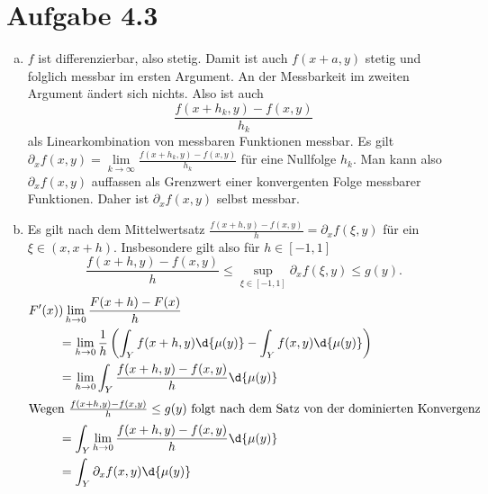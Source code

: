 \documentclass{article}
\begin{document}
    \section*{Aufgabe 4.3}
    \begin{enumerate}[(a)]
        \item $f$ ist differenzierbar, also stetig. Damit ist auch $f(x + a,y)$ stetig und folglich messbar im ersten Argument. An der Messbarkeit im zweiten Argument ändert sich nichts. Also ist auch
        \[
            \frac{f(x + h_k, y) - f(x,y)}{h_k}
        \]
        als Linearkombination von messbaren Funktionen messbar.
        Es gilt $\partial_x f(x,y) = \lim\limits_{k \to \infty} \frac{f(x + h_k, y) - f(x,y)}{h_k}$ für eine Nullfolge $h_k$. Man kann also $\partial_x f(x,y)$ auffassen als Grenzwert einer konvergenten Folge messbarer Funktionen. Daher ist $\partial_x f(x,y)$ selbst messbar.
        \item Es gilt nach dem Mittelwertsatz $\frac{f(x+h,y) - f(x,y)}{h} = \partial_x f(\xi, y)$ für ein $\xi \in (x, x+h)$.
        Insbesondere gilt also für $h\in [-1,1]$
        \[
            \frac{f(x+h,y) - f(x,y)}{h} \leq \sup_{\xi\in [-1,1]} \partial_x f(\xi, y)\leq g(y).
        \]
        \begin{align*}
            F'(x) &) \lim\limits_{h \to 0} \frac{F(x + h) - F(x)}{h}\\
            &= \lim\limits_{h \to 0} \frac{1}{h}\left(\int_Y f(x+h,y) \d{\mu(y)} - \int_Y f(x,y) \d{\mu(y)}\right)\\
            &= \lim\limits_{h \to 0}\int_Y  \frac{f(x+h,y) - f(x,y)}{h}\d{\mu(y)}\\
            \intertext{Wegen $\frac{f(x+h,y) - f(x,y)}{h} \leq g(y)$ folgt nach dem Satz von der dominierten Konvergenz}
            &= \int_Y  \lim\limits_{h \to 0} \frac{f(x+h,y) - f(x,y)}{h}\d{\mu(y)}\\
            &= \int_Y \partial_x f(x,y) \d{\mu(y)}
        \end{align*}
    \end{enumerate}
\end{document}
